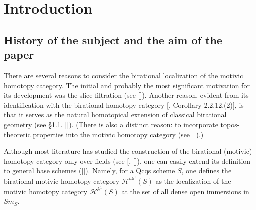 \begin{abstract}
We promote the $n$-birational motivic homotopy category $S\mapsto \mathcal{H}^n(S)$ to a $Pr^L$-valued presheaf on $Corr(\mathrm{Sch})_{uglt,sm}$. As a consequence, for any unibranch scheme $X$, its (zeroth) birational motivic homotopy category $\mathcal{H}^{b\mathbb{A}^1}(X)$ decomposes as the product of the birational motivic homotopy categories of its function fields; in particular, for a variety $V$, $\mathcal{H}^{b\mathbb{A}^1}(V) \simeq \mathcal{H}^{b\mathbb{A}^1}(k(V))$. This implies that birational equivalences of unibranch schemes in $Sm_S$ can be detected by the birational contractibility of their generic fibers. Finally, we establish that stably birational morphisms and purely transcendental field extensions induce fully faithful embeddings of birational motivic homotopy categories.
\end{abstract}
\tableofcontents

\section{Introduction}
\subsection{History of the subject and the aim of the paper}

There are several reasons to consider the birational localization of the motivic homotopy category. The initial and probably the most significant motivation for its development was the slice filtration (see [\cite{pelaez2014unstable}]). Another reason, evident from its identification with the birational homotopy category [\cite{0bat}, Corollary 2.2.12.(2)], is that it serves as the natural homotopical extension of classical birational geometry (see \S1.1. [\cite{0bat}]). (There is also a distinct reason: to incorporate topos-theoretic properties into the motivic homotopy category (see [\cite{inhot}]).)


Although most literature has studied the construction of the birational (motivic) homotopy category only over fields (see [\cite{choudhury2022characterisation}, [\cite{cisinski2023homotopy}]), one can easily extend its definition to general base schemes ([\cite{0bat}]). Namely, for a Qcqs scheme $S$, one defines the birational motivic homotopy category $\mathcal{H}^{b\mathbb{A}^1}(S)$ as the localization of the motivic homotopy category $\mathcal{H}^{\mathbb{A}^1}(S)$ at the set of all dense open immersions in $Sm_S$. 

